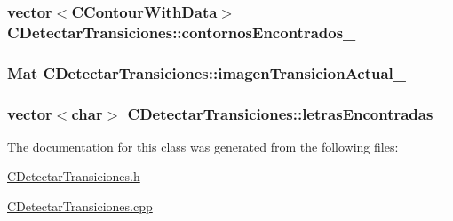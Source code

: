 \subsubsection[{\texorpdfstring{contornos\+Encontrados\+\_\+}{contornosEncontrados_}}]{\setlength{\rightskip}{0pt plus 5cm}vector$<${\bf C\+Contour\+With\+Data}$>$ C\+Detectar\+Transiciones\+::contornos\+Encontrados\+\_\+\hspace{0.3cm}{\ttfamily [private]}}\hypertarget{classCDetectarTransiciones_a76910f415a085c5e73126ec3fb62a174}{}\label{classCDetectarTransiciones_a76910f415a085c5e73126ec3fb62a174}
\subsubsection[{\texorpdfstring{imagen\+Transicion\+Actual\+\_\+}{imagenTransicionActual_}}]{\setlength{\rightskip}{0pt plus 5cm}Mat C\+Detectar\+Transiciones\+::imagen\+Transicion\+Actual\+\_\+\hspace{0.3cm}{\ttfamily [private]}}\hypertarget{classCDetectarTransiciones_aa58ae70139c85dc3838338eb53a520d3}{}\label{classCDetectarTransiciones_aa58ae70139c85dc3838338eb53a520d3}
\subsubsection[{\texorpdfstring{letras\+Encontradas\+\_\+}{letrasEncontradas_}}]{\setlength{\rightskip}{0pt plus 5cm}vector$<$char$>$ C\+Detectar\+Transiciones\+::letras\+Encontradas\+\_\+\hspace{0.3cm}{\ttfamily [private]}}\hypertarget{classCDetectarTransiciones_a0bc5a3fc42f833f3e649e8b8c2fe573d}{}\label{classCDetectarTransiciones_a0bc5a3fc42f833f3e649e8b8c2fe573d}


The documentation for this class was generated from the following files\+:\begin{DoxyCompactItemize}
\item 
\hyperlink{CDetectarTransiciones_8h}{C\+Detectar\+Transiciones.\+h}\item 
\hyperlink{CDetectarTransiciones_8cpp}{C\+Detectar\+Transiciones.\+cpp}\end{DoxyCompactItemize}

